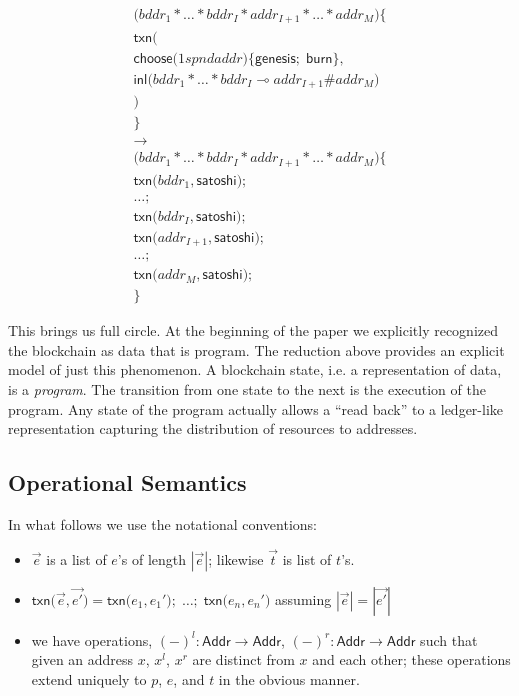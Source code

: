 \documentclass[]{acm_proc_article-sp}
\numberwithin{equation}{subsection}
\begin{document}
\begin{equation*}
  \begin{aligned} 
    \mathsf{(} bddr_1 * \ldots * bddr_I * addr_{I+1} * \ldots * addr_M  \mathsf{)} \mathsf{\{} \\
    \mathsf{txn}\mathsf{(} \\
    \mathsf{choose}\mathsf{(} 1spndaddr \mathsf{)}\mathsf{\{} \mathsf{genesis}\mathsf{;}\; \mathsf{burn} \mathsf{\}}, \\
    \mathsf{inl}\mathsf{(} bddr_1 * \ldots * bddr_I \multimap addr_{I+1} \# addr_M \mathsf{)} \\
    \mathsf{)} \\
    \mathsf{\}} \\
    \rightarrow \\
    \mathsf{(} bddr_1 * \ldots * bddr_I * addr_{I+1} * \ldots * addr_M  \mathsf{)} \mathsf{\{} \\
    \mathsf{txn}\mathsf{(} bddr_1, \mathsf{satoshi} \mathsf{)} \mathsf{;}\\
    \ldots \mathsf{;} \\
    \mathsf{txn}\mathsf{(} bddr_I, \mathsf{satoshi} \mathsf{)} \mathsf{;} \\
    \mathsf{txn}\mathsf{(} addr_{I+1}, \mathsf{satoshi} \mathsf{)} \mathsf{;} \\
    \ldots \mathsf{;} \\
    \mathsf{txn}\mathsf{(} addr_M, \mathsf{satoshi} \mathsf{)} \mathsf{;} \\
    \mathsf{\}}
  \end{aligned}   
\end{equation*}

This brings us full circle. At the beginning of the paper we
explicitly recognized the blockchain as data that is program. The
reduction above provides an explicit model of just this phenomenon. A
blockchain state, i.e. a representation of data, is a
\emph{program}. The transition from one state to the next is the
execution of the program. Any state of the program actually allows a
``read back'' to a ledger-like representation capturing the
distribution of resources to addresses.

\subsection{Operational Semantics}

In what follows we use the notational conventions:
\begin{itemize}
  \item $\vec{e}$ is a list of $e$'s of length $|\vec{e}|$; likewise $\vec{t}$ is list of $t$'s.
  \item $\mathsf{txn}\mathsf{(} \vec{e}, \vec{e'} \mathsf{)} = \mathsf{txn}\mathsf{(} e_1, e_1' \mathsf{)}\mathsf{;}\; \ldots \mathsf{;} \; \mathsf{txn}\mathsf{(} e_n, e_n' \mathsf{)}$ assuming $|\vec{e}| = |\vec{e'}|$
  \item we have operations, $( - )^l : \mathsf{Addr} \to \mathsf{Addr}$, $( - )^r : \mathsf{Addr} \to \mathsf{Addr}$ such that given an address $x$, $x^l$, $x^r$ are distinct from $x$ and each other; these operations extend uniquely to $p$, $e$, and $t$ in the obvious manner.
\end{itemize}
\end{document}
